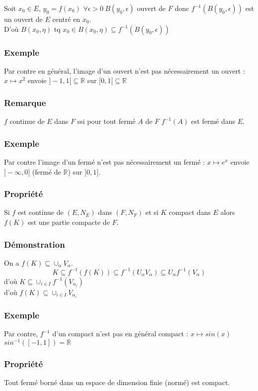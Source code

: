 \documentclass[a4paper, oneside]{report}
\newcommand{\R}{\mathbb{R}}
\newcommand{\dem}{\subsubsection{Démonstration}}
\newcommand{\propr}{\subsubsection{Propriété}}
\newcommand{\remar}{\subsubsection{Remarque}}
\newcommand{\exem}{\subsubsection{Exemple}}
\begin{document}
Soit $x_0\in E$, $y_0=f(x_0)$ $\forall \epsilon >0~B(y_0,\epsilon)$ ouvert de $F$ donc $f^{-1}(B(y_0,\epsilon))$ est un ouvert de $E$ centré en $x_0$.\\
D'où $B(x_0,\eta)$ tq $x_0 \in B(x_0,\eta)\subseteq f^{-1}(B(y_0,\epsilon))$

\exem
Par contre en général, l'image d'un ouvert n'est pas nécessairement un ouvert :
$x\mapsto x^2$ envoie $]-1,1[\subseteq\R$ sur $[0,1[\subseteq \R$

\remar
$f$ continue de $E$ dans $F$ ssi pour tout fermé $A$ de $F$ $f^{-1}(A)$ est fermé dans $E$.

\exem
Par contre l'image d'un fermé n'est pas nécessairement un fermé : $x\mapsto e^x$ envoie $]-\infty,0]$ (fermé de $\R$) sur $]0,1]$.

\propr
Si $f$ est continue de $(E, N_E)$ dans $(F, N_F)$ et si $K$ compact dans $E$ alors $f(K)$ est une partie compacte de $F$.

\dem
On a $f(K)\subseteq \cup_\alpha V_\alpha$.
$$K\subseteq f^{-1}(f(K)) \subseteq f^{-1}(U_\alpha V_\alpha)\subseteq U_\alpha f^{-1}(V_\alpha)$$
d'où $K\subseteq \cup_{i\in I} f^{-1}(V_{\alpha_i})$\\
d'où $f(K)\subseteq \cup_{i\in I} V_{\alpha_i}$

\exem
Par contre, $f^{-1}$ d'un compact n'est pas en général compact : $x\mapsto sin(x)$ $sin^{-1}([-1,1])=\R$

\propr
Tout fermé borné dans un espace de dimension finie (normé) est compact.
\end{document}
